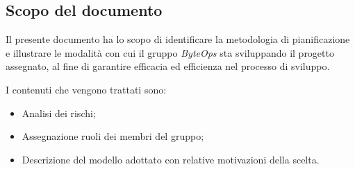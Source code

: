 \subsection{Scopo del documento}
    Il presente documento ha lo scopo di identificare la metodologia di pianificazione e illustrare le modalità con cui il gruppo \textit{ByteOps} sta sviluppando il progetto assegnato, al fine di garantire efficacia ed efficienza nel processo di sviluppo.  
    
    I contenuti che vengono trattati sono:
    \begin{itemize}
        \item Analisi dei rischi;
        \item Assegnazione ruoli dei membri del gruppo;
        \item Descrizione del modello adottato con relative motivazioni della scelta.
    \end{itemize}
